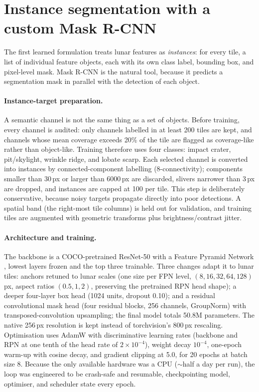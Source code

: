 \section{Instance segmentation with a custom Mask R-CNN}
\label{sec:maskrcnn}

The first learned formulation treats lunar features as \emph{instances}: for every tile, a list of individual feature objects, each with its own class label, bounding box, and pixel-level mask. Mask R-CNN \citep{he2017maskrcnn} is the natural tool, because it predicts a segmentation mask in parallel with the detection of each object.

\paragraph{Instance-target preparation.}
A semantic channel is not the same thing as a set of objects. Before training, every channel is audited: only channels labelled in at least 200 tiles are kept, and channels whose mean coverage exceeds 20\% of the tile are flagged as coverage-like rather than object-like. Training therefore uses four classes: impact crater, pit/skylight, wrinkle ridge, and lobate scarp. Each selected channel is converted into instances by connected-component labelling (8-connectivity); components smaller than 30\,px or larger than 6000\,px are discarded, slivers narrower than 3\,px are dropped, and instances are capped at 100 per tile. This step is deliberately conservative, because noisy targets propagate directly into poor detections. A spatial band (the right-most tile columns) is held out for validation, and training tiles are augmented with geometric transforms plus brightness/contrast jitter.

\paragraph{Architecture and training.}
The backbone is a COCO-pretrained ResNet-50 with a Feature Pyramid Network \citep{he2016resnet,lin2017fpn}, lowest layers frozen and the top three trainable. Three changes adapt it to lunar tiles: anchors retuned to lunar scales (one size per FPN level, $(8,16,32,64,128)$\,px, aspect ratios $(0.5,1,2)$, preserving the pretrained RPN head shape); a deeper four-layer box head (1024 units, dropout 0.10); and a residual convolutional mask head (four residual blocks, 256 channels, GroupNorm) with transposed-convolution upsampling; the final model totals 50.8M parameters. The native 256\,px resolution is kept instead of torchvision's 800\,px rescaling. Optimisation uses AdamW \citep{loshchilov2019adamw} with discriminative learning rates (backbone and RPN at one tenth of the head rate of $2\times10^{-4}$), weight decay $10^{-4}$, one-epoch warm-up with cosine decay, and gradient clipping at 5.0, for 20 epochs at batch size 8. Because the only available hardware was a CPU (${\sim}$half a day per run), the loop was engineered to be crash-safe and resumable, checkpointing model, optimiser, and scheduler state every epoch.

